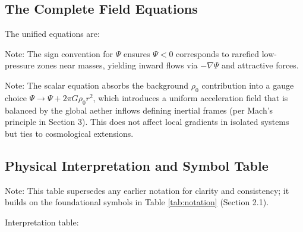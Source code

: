\subsection{The Complete Field Equations}

The unified equations are:

\medskip
\noindent
\makebox[\linewidth][c]{%
\fbox{%
\begin{minipage}{\dimexpr\linewidth-2\fboxsep-2\fboxrule\relax}
\[
\frac{1}{v_{\text{eff}}^2} \frac{\partial^2 \Psi}{\partial t^2} - \nabla^2 \Psi = 4\pi G \rho_{\text{body}}(\mathbf{r}, t)
\]

\[
\frac{1}{c^2} \frac{\partial^2 \mathbf{A}}{\partial t^2} - \nabla^2 \mathbf{A} = -\frac{16\pi G}{c^2} \rho_{\text{body}}(\mathbf{r}, t) \mathbf{V}(\mathbf{r}, t)
\]

\[
\mathbf{a}(\mathbf{r}, t) = -\nabla \Psi + \xi \, \partial_t (\nabla \times \mathbf{A})
\]

\[
\mathbf{F} = m \left[ -\nabla \Psi - \partial_t \mathbf{A} + 4 \mathbf{v}_m \times (\nabla \times \mathbf{A}) \right]
\]
\end{minipage}
}
}
\medskip

Note: The sign convention for $\Psi$ ensures $\Psi < 0$ corresponds to rarefied low-pressure zones near masses, yielding inward flows via $-\nabla \Psi$ and attractive forces.

Note: The scalar equation absorbs the background $\rho_0$ contribution into a gauge choice $\Psi \to \Psi + 2\pi G \rho_0 r^2$, which introduces a uniform acceleration field that is balanced by the global aether inflows defining inertial frames (per Mach's principle in Section 3). This does not affect local gradients in isolated systems but ties to cosmological extensions.

\subsection{Physical Interpretation and Symbol Table}

Note: This table supersedes any earlier notation for clarity and consistency; it builds on the foundational symbols in Table \ref{tab:notation} (Section 2.1).

Interpretation table:

